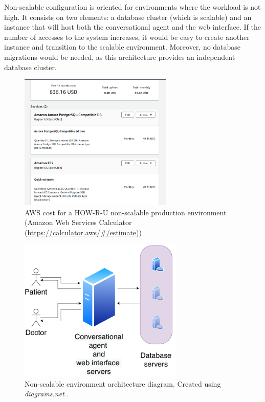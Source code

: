 \documentclass[12pt,english]{article}
\begin{document}
Non-scalable configuration is oriented for environments where the workload is not high. It consists on two elements: a database cluster (which is scalable) and an instance that will host both the conversational agent and the web interface. If the number of accesses to the system increases, it would be easy to create another instance and transition to the scalable environment. Moreover, no database migrations would be needed, as this architecture provides an independent database cluster.

\begin{figure}[H]
  \centering
  \includegraphics[width=0.65\textwidth]{cost_noscalable.png}
  \caption{AWS cost for a HOW-R-U non-scalable production environment (Amazon Web Services Calculator (\href{https://calculator.aws/\#/estimate}{https://calculator.aws/\#/estimate}))}
\end{figure}

\begin{figure}[H]
  \centering
  \includegraphics[width=0.7\textwidth]{non-scalable.pdf}
  \caption{Non-scalable environment architecture diagram. Created using \emph{diagrams.net} \protect\cite{drawio}.}
\end{figure}
\newpage
\end{document}
